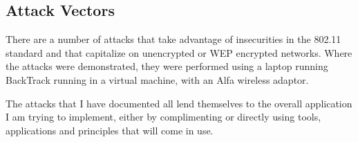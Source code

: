 \clearpage
\subsection{Attack Vectors}
\label{sec:attacks}
There are a number of attacks that take advantage of insecurities in the 802.11 standard and that capitalize on unencrypted or WEP encrypted networks.  Where the attacks were demonstrated, they were performed using a laptop running BackTrack running in a virtual machine, with an Alfa wireless adaptor.

The attacks that I have documented all lend themselves to the overall application I am trying to implement, either by complimenting or directly using tools, applications and principles that will come in use.




